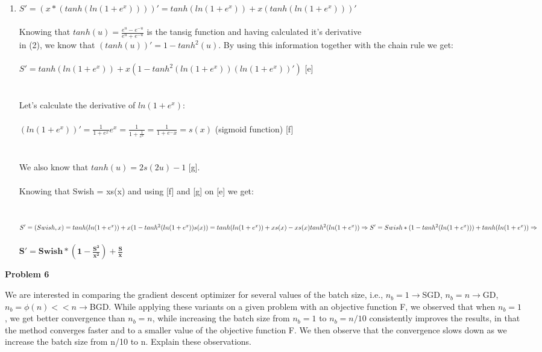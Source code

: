 \documentclass{article}
\begin{document}
\begin{enumerate}
  \item $S' = (x*(tanh(ln(1+e^{x}))))' = tanh(ln(1+e^{x})) + x(tanh(ln(1+e^{x})))'$ \\ \\ Knowing that $tanh(u) = \frac{e^{u}-e^{-u}}{e^{u}+e^{-u}}$ is the tansig function and having calculated it's derivative \\ 
  in (2), we know that $(tanh(u))' = 1 - tanh^2(u)$. By using this information together with the chain rule we get: \\ \\ $S' = tanh(ln(1+e^{x})) + x(1 - tanh^2(ln(1+e^{x}))(ln(1+e^{x}))')$ \hspace{0.5cm} [e] \\ \\ \\
  Let's calculate the derivative of $ln(1+e^{x})$: \\ \\$(ln(1+e^{x}))' = \frac{1}{1+e^{x}}e^x = \frac{1}{1+\frac{1}{e^x}} = \frac{1}{1+e^-x} = s(x)$ (sigmoid function)\hspace{0.3cm} [f]\\ \\ \\We also know that
  $tanh(u) = 2s(2u)-1$ \hspace{0.3cm} [g]. \\ \\ Knowing that Swish = xs(x) and using [f] and [g] on [e] we get: \\ \\ \\$S' = (Swish,x) = tanh(ln(1+e^{x})) + x(1 - tanh^2(ln(1+e^{x}))s(x)) =\\ \\ tanh(ln(1+e^{x})) + xs(x) - xs(x)tanh^2(ln(1+e^{x}))
  \Rightarrow \\ \\{S' = Swish*(1 - tanh^2(ln(1+e^{x}))) +tanh(ln(1+e^{x})) \Rightarrow}$ \\ \\$\bm{S' = Swish*(1-\frac{S^2}{x^2}) + \frac{S}{x}}$
\end{enumerate}

\newpage
\noindent \textbf{Problem 6}

\noindent We are interested in comparing the gradient descent optimizer for several values of the
batch size, i.e., $n_b=1\rightarrow$SGD, $n_b=n\rightarrow$GD, $n_b=\phi(n)<<n\rightarrow$BGD. While applying these
variants on a given problem with an objective function F, we observed that when $n_b=1$,
we get better convergence than $n_b=n$, while increasing the batch size from $n_b=1$ to
$n_b=n/10$ consistently improves the results, in that the method converges faster and to a
smaller value of the objective function F. We then observe that the convergence slows
down as we increase the batch size from n/10 to n.
Explain these observations. \\ \\
\end{document}
